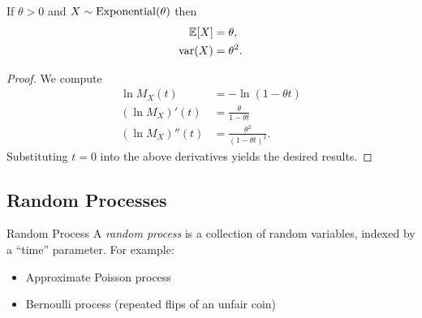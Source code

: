 \documentclass[class=article, crop=false]{standalone}
\begin{document}
  \begin{theorem}{}
    If $\theta > 0$ and $X\sim \operatorname{Exponential}(\theta)$ then
    \begin{align*}
      \mathbb{E}[X] &= \theta, \\
      \operatorname{var}(X) &= \theta^2.
    \end{align*}
    \begin{proof}
      We compute
      \begin{align*}
        \ln M_X(t) &= -\ln(1 - \theta t) \\
        (\ln M_X)'(t) &= \frac{\theta}{1 - \theta t} \\
        (\ln M_X)''(t) &= \frac{\theta^2}{(1 - \theta t)^2}.
      \end{align*}
      Substituting $t = 0$ into the above derivatives yields the desired results.
    \end{proof}
  \end{theorem}
  \subsection{Random Processes}
  \begin{definition}{Random Process}
    A \emph{random process} is a collection of random variables, indexed by a ``time'' parameter. For example:
    \begin{itemize}
      \item Approximate Poisson process
      \item Bernoulli process (repeated flips of an unfair coin)
    \end{itemize}
  \end{definition}
\end{document}
